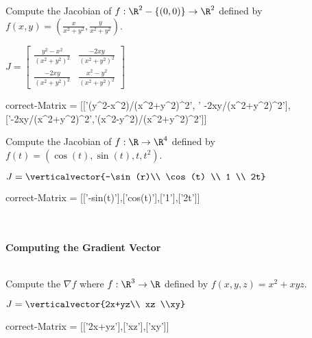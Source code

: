 \documentclass{ximera}
\begin{document}
	\begin{question}	
		Compute the Jacobian of $f:\R^2 - \{(0,0)\} \to \R^2$ defined by $f(x,y) = (\frac{x}{x^2+y^2},\frac{y}{x^2+y^2})$.
		\begin{solution}
		\begin{hint}
			\(J = \begin{bmatrix} \frac{y^2-x^2}{(x^2+y^2)^2} & \frac{-2xy}{(x^2+y^2)^2} \\   \frac{-2xy}{(x^2+y^2)^2} & \frac{x^2-y^2}{(x^2+y^2)^2}  \end{bmatrix}\)
		\end{hint}
		\begin{matrix-answer}[name=J]
			correct-Matrix  = [['(y^2-x^2)/(x^2+y^2)^2', ' -2xy/(x^2+y^2)^2'],['-2xy/(x^2+y^2)^2','(x^2-y^2)/(x^2+y^2)^2']]
		\end{matrix-answer}
		\end{solution}
	\end{question}
	
	\begin{question}	
		Compute the Jacobian of $f:\R \to \R^4$ defined by $f(t) = (\cos(t),\sin(t),t,t^2)$.
		\begin{solution}
		\begin{hint}
			\(J = \verticalvector{-\sin(r)\\ \cos(t) \\ 1 \\ 2t}\)
		\end{hint}
		\begin{matrix-answer}[name=J]
			correct-Matrix  = [['-sin(t)'],['cos(t)'],['1'],['2t']]
		\end{matrix-answer}
		\end{solution}
	\end{question}
	\\
	\\
	\textbf{Computing the Gradient Vector}	
	\\
	\\
	\begin{question}	
		Compute the $\nabla f$ where $f:\R^3 \to \R$ defined by $f(x,y,z) = x^2+xyz$.
		\begin{solution}
		\begin{hint}
			\(J = \verticalvector{2x+yz\\ xz \\xy}\)
		\end{hint}
		\begin{matrix-answer}[name=J]
			correct-Matrix  = [['2x+yz'],['xz'],['xy']]
		\end{matrix-answer}
		\end{solution}
	\end{question}
	
\end{document}
